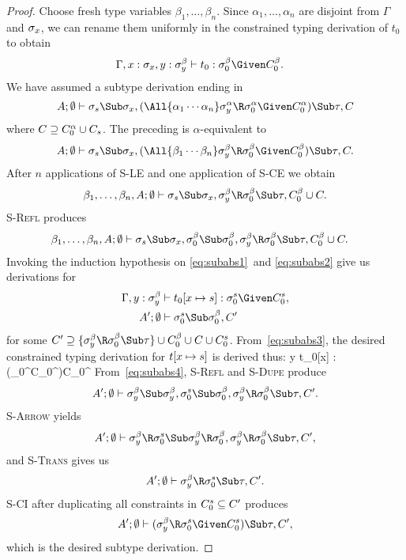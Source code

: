 \documentclass{amsart}
\theoremstyle{definition}
\begin{document}
\begin{proof}
Choose fresh type variables $\beta_1,\ldots,\beta_n$. Since
$\alpha_1,\ldots,\alpha_n$ are disjoint from $\Gamma$ and
$\sigma_x$, we can rename them uniformly in the constrained typing
derivation of $t_0$ to obtain
\begin{align}
\Gamma,x:\sigx,y:\sigby&\vdash t_0 : \sigb0\Given\Cb0.
\label{eq:subabs1}
\end{align}
We have assumed a subtype derivation ending in
\[
A;\Exi\vdash
\sigs\Sub\sigx,
(\All{\alpha_1\cdots\alpha_n}\sigay\R\siga0 \Given \Ca0)
\Sub \tau,
C
\]
where
$C\supseteq \Ca0\cup \Cs$.
The preceding is $\alpha$-equivalent to
\[
A;\Exi\vdash
\sigs\Sub\sigx,
(\All{\beta_1\cdots\beta_n}\sigby\R\sigb0 \Given \Cb0)
\Sub \tau,
C.
\]
After $n$ applications of \textsc{S-LE} and one application of
\textsc{S-CE} we obtain
\[
\beta_1,\ldots,\beta_n,A;\Exi\vdash
\sigs\Sub\sigx,
\sigby\R\sigb0 \Sub \tau,
\Cb0\cup C.
\]
\textsc{S-Refl} produces
\begin{align}
\beta_1,\ldots,\beta_n,A;\Exi&\vdash
\sigs\Sub\sigx,
\sigb0\Sub\sigb0,
\sigby\R\sigb0 \Sub \tau,
\Cb0\cup C.
\label{eq:subabs2}
\end{align}
Invoking the induction hypothesis on \eqref{eq:subabs1}~and
\eqref{eq:subabs2} give us derivations for
\def\sig0s{\sigma_0^\s}
\def\C0s{C_0^\s}
\begin{align}
\Gamma,y:\sigby &\vdash t_0[x\mapsto\s] :
\sig0s\Given\C0s,
\label{eq:subabs3}
\\
A';\Exi &\vdash
\sig0s \Sub \sigb0, C'
\label{eq:subabs4}
\end{align}
for some $C'\supseteq\{\sigby\R\sigb0 \Sub \tau\}\cup \Cb0 \cup
C \cup \C0s$. From~\eqref{eq:subabs3}, the desired constrained
typing derivation for $t[x\mapsto s]$ is derived thus:
%
\infrule[CT-Abs]%
{\emptyset\subseteq
\FTV(\sigby,\sig0s,\C0s)-\FTV(\Gamma)
\andalso
\Gamma,y:\sigby \vdash t_0[x\mapsto\s] :
\sig0s\Given\C0s
}%
{\Gamma\vdash
\Abs y t_0[x\mapsto\s] :
(\sigby\R\sig0s\Given \C0s)\Given\C0s}%
%
From~\eqref{eq:subabs4}, \textsc{S-Refl} and \textsc{S-Dupe} produce
\[
A';\Exi \vdash
\sigby \Sub \sigby,
\sig0s \Sub \sigb0,
\sigby\R\sigb0 \Sub \tau,
C'.
\]
\textsc{S-Arrow} yields
\[
A';\Exi \vdash
\sigby\R\sig0s \Sub \sigby\R\sigb0,
\sigby\R\sigb0 \Sub \tau,
C',
\]
and \textsc{S-Trans} gives us
\[
A';\Exi \vdash
\sigby\R\sig0s \Sub \tau,
C'.
\]
\textsc{S-CI} after duplicating all constraints in $\C0s\subseteq
C'$ produces
\[
A';\Exi \vdash
(\sigby\R\sig0s\Given\C0s) \Sub \tau,
C',
\]
which is the desired subtype derivation.
\end{proof}


\end{document}
